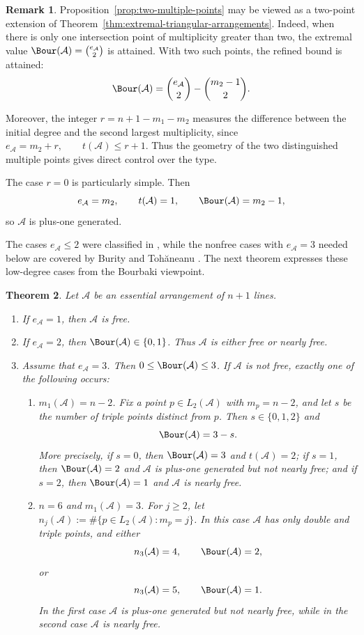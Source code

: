 \documentclass[11pt]{amsart}   %
\newtheorem{Theorem}{Theorem}[section]
\theoremstyle{definition}
\newtheorem{Remark}[Theorem]{Remark}
\def\A{{\mathcal A}}
\begin{document}
\begin{Remark}
\label{rem:two-multiple-points}
Proposition~\ref{prop:two-multiple-points} may be viewed as a two-point extension of Theorem~\ref{thm:extremal-triangular-arrangements}. Indeed, when there is only one intersection point of multiplicity greater than two, the extremal value $\Bour(\A)=\binom{e_\A}{2}$ is attained. With two such points, the refined bound is attained:
\[
\Bour(\A)=\binom{e_\A}{2}-\binom{m_2-1}{2}.
\]

Moreover, the integer $r=n+1-m_1-m_2$ measures the difference between the initial degree and the second largest multiplicity, since $e_\A=m_2+r,\qquad t(\A)\leq r+1.$ Thus the geometry of the two distinguished multiple points gives direct control over the type.

The case $r=0$ is particularly simple. Then
\[
e_\A=m_2,\qquad t(\A)=1,\qquad \Bour(\A)=m_2-1,
\]
so $\A$ is plus-one generated.
\end{Remark}
The cases $e_\A\leq2$ were classified in
\cite[Theorem~4.12 and Corollary~4.13]{Dimca-Ibadula-Macinic}, while
the nonfree cases with $e_\A=3$ needed below are covered by
Burity and Toh\u{a}neanu \cite[Theorem~2.6]{Burity-Tohaneanu}.
The next theorem expresses these low-degree cases from the Bourbaki
viewpoint.

\begin{Theorem}
\label{thm:low-degree-bourbaki-classification}
Let $\A$ be an essential arrangement of $n+1$ lines.
\begin{enumerate}
\item If $e_\A=1$, then $\A$ is free.

\item If $e_\A=2$, then $\Bour(\A)\in\{0,1\}$. Thus $\A$ is either
free or nearly free.

\item Assume that $e_\A=3$. Then $0\leq\Bour(\A)\leq3$. If $\A$ is
not free, exactly one of the following occurs:
\begin{enumerate}
\item $m_1(\A)=n-2$. Fix a point $p\in L_2(\A)$ with
$m_p=n-2$, and let $s$ be the number of triple points distinct from $p$. Then $s\in\{0,1,2\}$ and
\[
\Bour(\A)=3-s.
\]
More precisely, if $s=0$, then $\Bour(\A)=3$ and $t(\A)=2$; if $s=1$, then $\Bour(\A)=2$ and $\A$ is plus-one generated but not nearly free; and if $s=2$, then $\Bour(\A)=1$ and $\A$ is nearly free.

\item $n=6$ and $m_1(\A)=3$. For $j\geq2$, let $n_j(\A):=\#\{p\in L_2(\A):m_p=j\}$. In this case $\A$ has only double and
triple points, and either
\[
n_3(\A)=4,\qquad \Bour(\A)=2,
\]
or
\[
n_3(\A)=5,\qquad \Bour(\A)=1.
\]
In the first case $\A$ is plus-one generated but not nearly free, while in the second case $\A$ is nearly free.
\end{enumerate}
\end{enumerate}
\end{Theorem}
\end{document}
